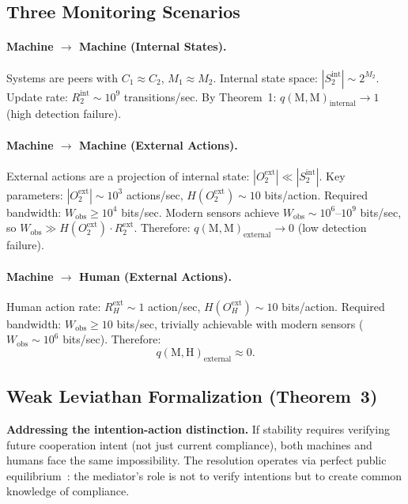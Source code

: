 \documentclass[11pt]{article}
\begin{document}
\subsection{Three Monitoring Scenarios}
\label{sec:S6.3}

\paragraph{Machine $\to$ Machine (Internal States).}
Systems are peers with $C_1 \approx C_2$, $M_1 \approx M_2$. Internal state space: $|S_2^{\text{int}}| \sim 2^{M_2}$. Update rate: $R_2^{\text{int}} \sim 10^9$ transitions/sec. By Theorem~1: $q(\text{M},\text{M})_{\text{internal}} \to 1$ (high detection failure).

\paragraph{Machine $\to$ Machine (External Actions).}
External actions are a projection of internal state: $|O_2^{\text{ext}}| \ll |S_2^{\text{int}}|$. Key parameters: $|O_2^{\text{ext}}| \sim 10^3$ actions/sec, $H(O_2^{\text{ext}}) \sim 10$ bits/action. Required bandwidth: $W_{\text{obs}} \geq 10^4$ bits/sec. Modern sensors achieve $W_{\text{obs}} \sim 10^6$--$10^9$ bits/sec, so $W_{\text{obs}} \gg H(O_2^{\text{ext}}) \cdot R_2^{\text{ext}}$. Therefore: $q(\text{M},\text{M})_{\text{external}} \to 0$ (low detection failure).

\paragraph{Machine $\to$ Human (External Actions).}
Human action rate: $R_H^{\text{ext}} \sim 1$ action/sec, $H(O_H^{\text{ext}}) \sim 10$ bits/action. Required bandwidth: $W_{\text{obs}} \geq 10$ bits/sec, trivially achievable with modern sensors ($W_{\text{obs}} \sim 10^6$ bits/sec). Therefore:
\[q(\text{M},\text{H})_{\text{external}} \approx 0.\]

\subsection{Weak Leviathan Formalization (Theorem~3)}
\label{sec:S6.4}

\textbf{Addressing the intention-action distinction.} If stability requires verifying future cooperation intent (not just current compliance), both machines and humans face the same impossibility. The resolution operates via perfect public equilibrium~\cite{fudenberg.1994}: the mediator's role is not to verify intentions but to create common knowledge of compliance.
\end{document}

